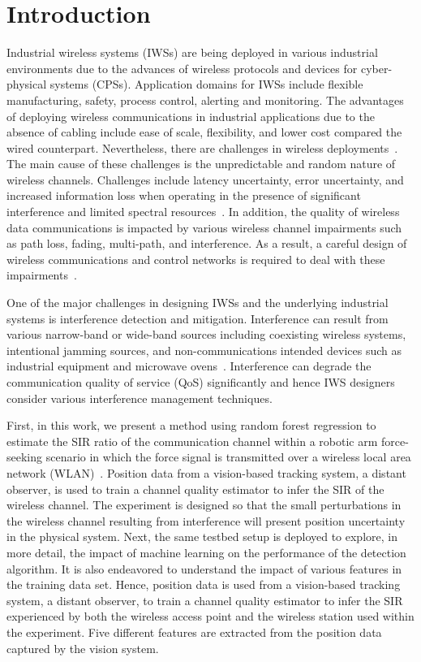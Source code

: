 	\section{Introduction} \label{ftml:sec:intro}    
	Industrial wireless systems (IWSs) are being deployed in various industrial environments due to the advances of wireless protocols and devices for cyber-physical systems (CPSs). Application domains for IWSs include flexible manufacturing, safety, process control, alerting and monitoring\cite{Candell2018.IWSGuide}. The advantages of deploying wireless communications in industrial applications due to the absence of cabling include ease of scale, flexibility, and lower cost compared the wired counterpart. Nevertheless, there are challenges in wireless deployments~\cite{Sisinni2018,Bello2017,Pang2017.WirelessChallenges}. The main cause of these challenges is the unpredictable and random nature of wireless channels. Challenges include latency uncertainty, error uncertainty, and  increased information loss when operating in the presence of significant interference and limited spectral resources~\cite{Candell2017.SAS.IWSWorkshopReport}. In addition, the quality of wireless data communications is impacted by various wireless channel impairments such as path loss, fading, multi-path, and interference. As a result, a careful design of wireless communications and control networks is required to deal with these impairments~\cite{Lu2016.WirelessCPS,Kim2017.WirelessCodesign}.    
    
    One of the major challenges in designing IWSs and the underlying industrial systems is interference detection and mitigation. Interference can result from various narrow-band or wide-band sources including  coexisting wireless systems, intentional jamming sources, and non-communications intended devices such as industrial equipment and microwave ovens~\cite{Chiwewe2015.Survey.CR.Intf}. Interference can degrade the communication quality of service (QoS) significantly and hence IWS designers consider various interference management techniques. 
    
    First, in this work, we present a method using random forest regression to estimate the SIR ratio of the communication channel within a robotic arm force-seeking scenario in which the force signal is transmitted over a wireless local area network (WLAN)~\cite{IEEE802.11ac}.  Position data from a vision-based tracking system, a distant observer, is used to train a channel quality estimator to infer the SIR of the wireless channel. The experiment is designed so that the small perturbations in the wireless channel resulting from interference will present position uncertainty in the physical system.  Next, the same testbed setup is deployed to explore, in more detail, the impact of machine learning on the performance of the detection algorithm.  It is also endeavored to understand the impact of various features in the training data set. Hence, position data is used from a vision-based tracking system, a distant observer, to train a channel quality estimator to infer the SIR experienced by both the wireless access point and the wireless station used within the experiment. Five different features are extracted from the position data captured by the vision system. 
    
